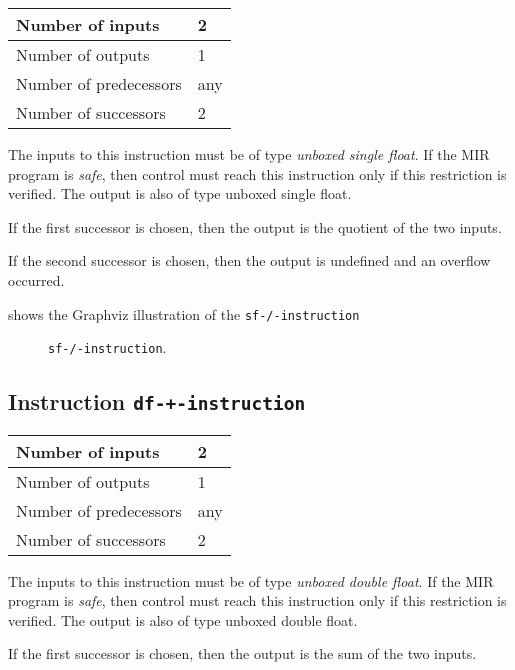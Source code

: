 \begin{tabular}{|l|l|}
\hline
Number of inputs & 2\\
\hline
Number of outputs & 1\\
\hline
Number of predecessors & any\\
\hline
Number of successors & 2\\
\hline
\end{tabular}

The inputs to this instruction must be of type \emph{unboxed single
  float}.  If the MIR program is \emph{safe}, then control must reach
this instruction only if this restriction is verified.  The output is
also of type unboxed single float.

If the first successor is chosen, then the output is
the quotient of the two inputs.  

If the second successor is chosen, then the output is undefined and an
overflow occurred. 

 shows the Graphviz illustration of the
\texttt{sf-/-instruction}

\begin{figure}
\begin{center}
\end{center}
\caption{\label{fig-sf-/-instruction}
\texttt{sf-/-instruction}.}
\end{figure}

\subsection{Instruction \texttt{df-+-instruction}}
\label{mir-instruction-df-+}

\begin{tabular}{|l|l|}
\hline
Number of inputs & 2\\
\hline
Number of outputs & 1\\
\hline
Number of predecessors & any\\
\hline
Number of successors & 2\\
\hline
\end{tabular}

The inputs to this instruction must be of type \emph{unboxed double
  float}.  If the MIR program is \emph{safe}, then control must reach
this instruction only if this restriction is verified.  The output is
also of type unboxed double float.

If the first successor is chosen, then the output is
the sum of the two inputs.  

